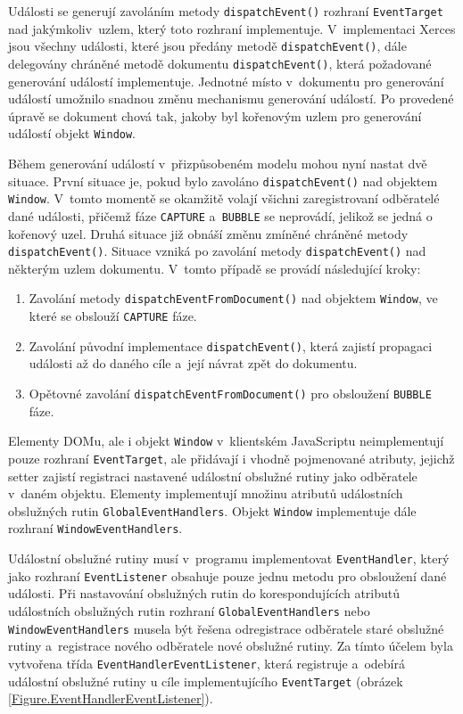 Události se generují zavoláním metody \texttt{dispatchEvent()} rozhraní \texttt{EventTarget} nad jakýmkoliv~uzlem, který toto rozhraní implementuje. V~implementaci Xerces jsou všechny události, které jsou předány metodě \texttt{dispatchEvent()}, dále delegovány chráněné metodě dokumentu \texttt{dispatchEvent()}, která požadované generování událostí implementuje. Jednotné místo v~dokumentu pro generování událostí umožnilo snadnou změnu mechanismu generování událostí. Po provedené úpravě se dokument chová tak, jakoby byl kořenovým uzlem pro generování událostí objekt \texttt{Window}.

Během generování událostí v~přizpůsobeném modelu mohou nyní nastat dvě situace. První situace je, pokud bylo zavoláno \texttt{dispatchEvent()} nad objektem \texttt{Window}. V~tomto momentě se okamžitě volají všichni zaregistrovaní odběratelé dané události, přičemž fáze \texttt{CAPTURE} a~\texttt{BUBBLE} se neprovádí, jelikož se jedná o kořenový uzel. Druhá situace již obnáší změnu zmíněné chráněné metody \texttt{dispatchEvent()}. Situace vzniká po zavolání metody \texttt{dispatchEvent()} nad některým uzlem dokumentu. V~tomto případě se provádí následující kroky:

\begin{enumerate}
  \item Zavolání metody \texttt{dispatchEventFromDocument()} nad objektem \texttt{Window}, ve které se obslouží \texttt{CAPTURE} fáze. 
  \item Zavolání původní implementace \texttt{dispatchEvent()}, která zajistí propagaci události až do daného cíle a~její návrat zpět do dokumentu. 
  \item Opětovné zavolání \texttt{dispatchEventFromDocument()} pro obsloužení \texttt{BUBBLE} fáze.
\end{enumerate}

Elementy DOMu, ale i objekt \texttt{Window} v~klientském JavaScriptu neimplementují pouze rozhraní \texttt{EventTarget}, ale přidávají i vhodně pojmenované atributy, jejichž setter zajistí registraci nastavené událostní obslužné rutiny jako odběratele v~daném objektu. Elementy implementují množinu atributů událostních obslužných rutin \texttt{GlobalEventHandlers}. Objekt \texttt{Window} implementuje dále rozhraní \texttt{WindowEventHandlers}.

Událostní obslužné rutiny musí v~programu implementovat \texttt{EventHandler}, který jako rozhraní \texttt{EventListener} obsahuje pouze jednu metodu pro obsloužení dané události. Při nastavování obslužných rutin do korespondujících atributů událostních obslužných rutin rozhraní \texttt{GlobalEventHandlers} nebo \texttt{WindowEventHandlers} musela být řešena odregistrace odběratele staré obslužné rutiny a~registrace nového odběratele nové obslužné rutiny. Za tímto účelem byla vytvořena třída \texttt{EventHandlerEventListener}, která registruje a~odebírá událostní obslužné rutiny u cíle implementujícího \texttt{EventTarget} (obrázek \ref{Figure.EventHandlerEventListener}).

